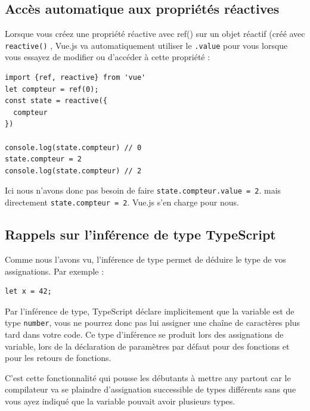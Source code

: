 \documentclass{article}
\begin{document}
\subsection{Accès automatique aux propriétés réactives}
Lorsque vous créez une propriété réactive avec {\color{monOrange}ref()} sur un objet réactif (créé avec {\tt reactive()} , {\color{monOrange}Vue.js} va automatiquement utiliser le {\tt .value} pour vous lorsque vous essayez de modifier ou d'accéder à cette propriété :
\begin{verbatim}
import {ref, reactive} from 'vue'
let compteur = ref(0);
const state = reactive({
  compteur
})

console.log(state.compteur) // 0
state.compteur = 2
console.log(state.compteur) // 2
\end{verbatim}
Ici nous n'avons donc pas besoin de faire {\tt state.compteur.value = 2}. mais directement {\tt state.compteur = 2}. {\color{monOrange}Vue.js} s'en charge pour nous.

\subsection{Rappels sur l'inférence de type {\color{monOrange}TypeScript}}
Comme nous l'avons vu, l'inférence de type permet de déduire le type de vos assignations. Par exemple :
\begin{verbatim}
let x = 42;
\end{verbatim}

Par l'inférence de type, {\color{monOrange}TypeScript} déclare implicitement que la variable est de type {\tt number}, vous ne pourrez donc pas lui assigner une chaîne de caractères plus tard dans votre code. Ce type d'inférence se produit lors des assignations de variable, lors de la déclaration de paramètres par défaut pour des fonctions et pour les retours de fonctions.

C'est cette fonctionnalité qui pousse les débutants à mettre {\color{monOrange}any} partout car le compilateur va se plaindre d'assignation successible de types différents sans que vous ayez indiqué que la variable pouvait avoir plusieurs types.

\end{document}
